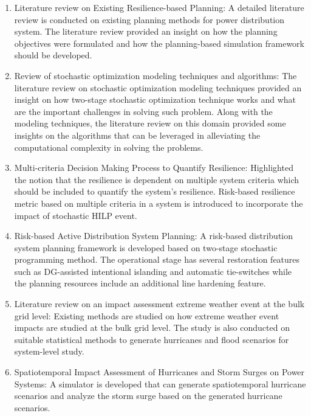 \documentclass[hidelinks, 12pt]{article}
\begin{document}
\begin{enumerate}
    \item Literature review on Existing Resilience-based Planning: A detailed literature review is conducted on existing planning methods for power distribution system. The literature review provided an insight on how the planning objectives were formulated and how the planning-based simulation framework should be developed.  
    
    \item Review of stochastic optimization modeling techniques and algorithms: The literature review on stochastic optimization modeling techniques provided an insight on how two-stage stochastic optimization technique works and what are the important challenges in solving such problem. Along with the modeling techniques, the literature review on this domain provided some insights on the algorithms that can be leveraged in alleviating the computational complexity in solving the problems.  
    
    \item Multi-criteria Decision Making Process to Quantify Resilience: Highlighted the notion that the resilience is dependent on multiple system criteria which should be included to quantify the system's resilience. Risk-based resilience metric based on multiple criteria in a system is introduced to incorporate the impact of stochastic HILP event. 
    
    \item Risk-based Active Distribution System Planning: A risk-based distribution system planning framework is developed based on two-stage stochastic programming method. The operational stage has several restoration features such as DG-assisted intentional islanding and automatic tie-switches while the planning resources include an additional line hardening feature.  
    
    \item Literature review on an impact assessment extreme weather event at the bulk grid level: Existing methods are studied on how extreme weather event impacts are studied at the bulk grid level. The study is also conducted on suitable statistical methods to generate hurricanes and flood scenarios for system-level study. 
    
    \item Spatiotemporal Impact Assessment of Hurricanes and Storm Surges on Power Systems: A simulator is developed that can generate spatiotemporal hurricane scenarios and analyze the storm surge based on the generated hurricane scenarios.   
    
\end{enumerate}
\end{document}
